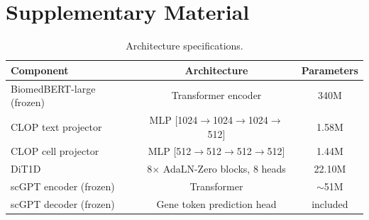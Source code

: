 \documentclass[11pt,a4paper]{article}
\newcommand{\appendixtitles}[1]{}  %
\newcommand{\appendixstart}{\appendix}  %
\begin{document}
\appendixtitles{yes}
\FloatBarrier
\clearpage
\appendixstart
\FloatBarrier
\appendix
\renewcommand{\thefigure}{A\arabic{figure}}
\setcounter{figure}{0}
\renewcommand{\thetable}{A\arabic{table}}
\setcounter{table}{0}
\setlength{\abovecaptionskip}{4pt}
\setlength{\belowcaptionskip}{0pt}
\section[\appendixname~\thesection]{Supplementary Material}\label{app:suppl-tables}\label{app:hyperparams}

\begin{table}[!htbp]
\caption{Architecture specifications.\label{tab:architecture}}
\begin{tabularx}{\textwidth}{lCC}
\toprule
\textbf{Component} & \textbf{Architecture} & \textbf{Parameters} \\
\midrule
BiomedBERT-large (frozen) & Transformer encoder  & 340M \\
CLOP text projector       & MLP [1024$\to$1024$\to$1024$\to$512] & 1.58M \\
CLOP cell projector       & MLP [512$\to$512$\to$512$\to$512]    & 1.44M \\
DiT1D                     & 8$\times$ AdaLN-Zero blocks, 8 heads & 22.10M \\
scGPT encoder (frozen)    & Transformer                          & $\sim$51M \\
scGPT decoder (frozen)    & Gene token prediction head           & included \\
\bottomrule
\end{tabularx}
\end{table}
\end{document}

